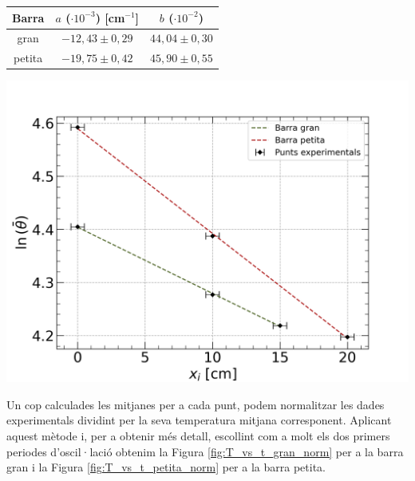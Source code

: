 \documentclass[12pt,twosides,onecolumn,openany]{article}
\newenvironment{Figura}
  {\par\medskip\noindent\minipage{\linewidth}}
  {\endminipage\par\medskip}
\begin{document}
\begin{multicols}{2}
\begin{Figura}
  \centering
  \begin{tabular}{c|c|c}
    Barra & $a$ ($\cdot 10^{-3}$) [cm$^{-1}$] & $b$ ($\cdot 10^{-2}$) \\ \hline\hline
    gran & $-12,43\pm0,29$ & $44,04\pm0,30$\\
    petita & $-19,75\pm0,42$ & $45,90\pm0,55$
  \end{tabular}
  \label{Tau:pendent_mitjana}
\end{Figura}
\begin{Figura}
  \centering
  \includegraphics[width=1\linewidth]{../../graphs/practica_Ia/plots/linear_reg.png}
  \label{fig:lin_reg}
\end{Figura}
Un cop calculades les mitjanes per a cada punt, podem normalitzar les dades experimentals dividint per la seva temperatura mitjana corresponent. Aplicant aquest mètode i, per a obtenir més detall, escollint com a molt els dos primers periodes d'oscil·lació obtenim la Figura \ref{fig:T_vs_t_gran_norm} per a la barra gran i la Figura \ref{fig:T_vs_t_petita_norm} per a la barra petita.
\begin{Figura}
  \centering

\end{Figura}
\end{multicols}
\end{document}

